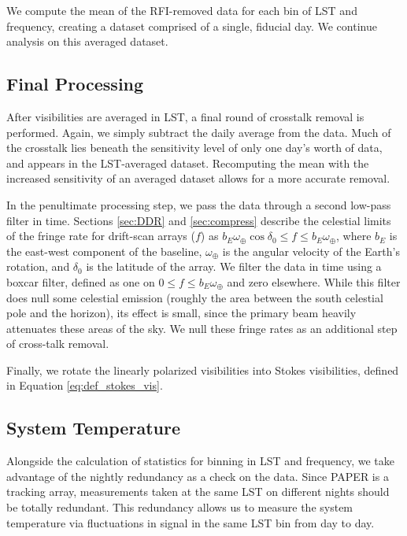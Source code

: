 We compute the mean of the RFI-removed data for each bin of LST and frequency, creating a dataset
comprised of a single, fiducial day. We continue analysis on this averaged dataset. 

\subsection{Final Processing}

After visibilities are averaged in LST, a final round of crosstalk removal is performed. Again, we
simply subtract the daily average from the data. Much of the crosstalk lies beneath the sensitivity
level of only one day's worth of data, and appears in the LST-averaged dataset. Recomputing the
mean with the increased sensitivity of an averaged dataset allows for a more accurate removal.

In the penultimate processing step, we pass the data through a second low-pass filter in time. Sections
\ref{sec:DDR} and \ref{sec:compress} describe the celestial limits of the fringe rate for drift-scan
arrays ($f$) as $b_E\omega_\oplus\cos\delta_0 \le f \le b_E\omega_\oplus$, where $b_E$ is the
east-west component of the baseline, $\omega_\oplus$ is the angular velocity of the Earth's
rotation, and $\delta_0$ is the latitude of the array. We filter the data in time using a boxcar
filter, defined as one on $0\le f\le b_E\omega_\oplus$ and zero elsewhere. While this filter does
null some celestial emission (roughly the area between the south celestial pole and the horizon),
its effect is small, since the primary beam heavily attenuates these areas of the sky. We null these
fringe rates as an additional step of cross-talk removal.

Finally, we rotate the linearly polarized visibilities into Stokes visibilities, defined in
Equation \ref{eq:def_stokes_vis}.

\subsection{System Temperature} \label{sec:Tsys}

Alongside the calculation of statistics for binning in LST and frequency, we take advantage of the
nightly redundancy as a check on the data. Since PAPER is a tracking array, measurements taken at
the same LST on different nights should be totally redundant. This redundancy allows us to measure
the system temperature via fluctuations in signal in the same LST bin from day to day.

